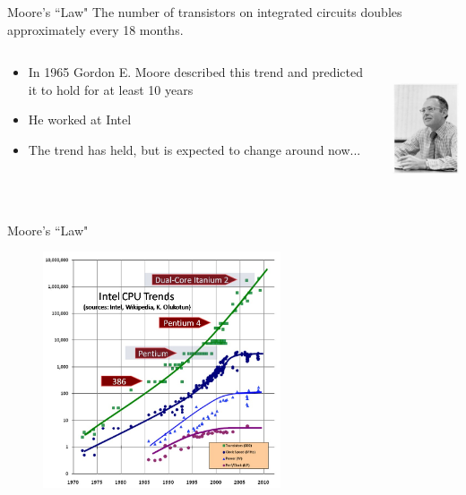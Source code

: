 \documentclass[xcolor=x11names,compress]{beamer}
\renewcommand{\(}{\begin{columns}}
\renewcommand{\)}{\end{columns}}
\newcommand{\<}[1]{\begin{column}{#1}}
\renewcommand{\>}{\end{column}}
\begin{document}
\begin{frame}{Moore's ``Law"}
The number of transistors on integrated circuits doubles approximately every 18 months. 

\begin{columns}
  \begin{column}{0.7\textwidth}
\begin{itemize}
\item In 1965 Gordon E. Moore described this trend and predicted it to hold for at least 10 years
\item He worked at Intel
\item The trend has held, but is expected to change around now...
\end{itemize}
  \end{column}
  \begin{column}{0.3\textwidth}
    \includegraphics[height=1.5in,clip]{GordonMoore1975}
  \end{column}
\end{columns}
\end{frame}

\begin{frame}{Moore's ``Law"}

\begin{figure}
\includegraphics[height=2.75in,clip]{CPU-Scaling}
\end{figure}

\end{frame}
\end{document}
